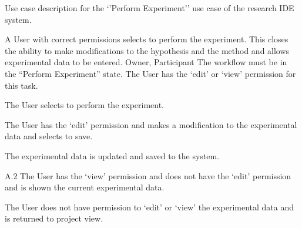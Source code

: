 \begin{table}
  \centering
  \caption{Use case description for the `'Perform Experiment'' use case of the research IDE system.}
  \label{tbl:use-case-perform-experiment}

  \begin{usecase}
    A User with correct permissions selects to perform the experiment. This closes the ability to make modifications to the hypothesis and the method  and allows experimental data to be entered.
    Owner, Participant
    The workflow must be in the “Perform Experiment” state. The User has the ‘edit’ or ‘view’ permission for this task.
    \ucnormal
    \begin{ucenum}
      \item The User selects to perform the experiment.
      \item The User has the ‘edit’ permission and makes a modification to the experimental data and selects to save.
      \item The experimental data is updated and saved to the system.
    \end{ucenum}
    \begin{ucenum}
      \item [A.2] The User has the ‘view’ permission and does not have the ‘edit’ permission and is shown the current experimental data.
    \end{ucenum}
    The User does not have permission to ‘edit’ or ‘view’ the experimental data and is returned to project view.
  \end{usecase}
\end{table}


